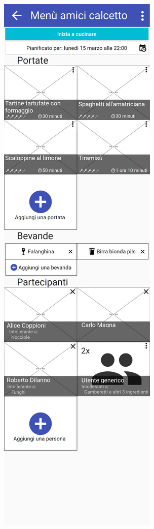 \begin{figure}[H]
	\begin{minipage}{.49\textwidth}
		\includegraphics[width=\textwidth]{img/wireframe/men_amici_calcetto.png}

\end{minipage}
\end{figure}
